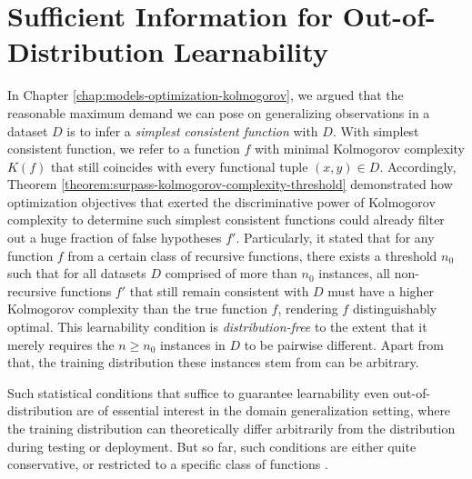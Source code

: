
\chapter{Sufficient Information for Out-of-Distribution Learnability}
\label{chap:sufficient-information-learnability}
In Chapter \ref{chap:models-optimization-kolmogorov}, we argued that the reasonable maximum demand we can pose on generalizing observations in a dataset $D$ is to infer a \textit{simplest consistent function} with $D$.
With simplest consistent function, we refer to a function $f$ with minimal Kolmogorov complexity $K(f)$ that still coincides with every functional tuple $(x,y)\in D$. 
Accordingly, Theorem \ref{theorem:surpass-kolmogorov-complexity-threshold} demonstrated how optimization objectives that exerted the discriminative power of Kolmogorov complexity to determine such simplest consistent functions could already filter out a huge fraction of false hypotheses $f'$.
Particularly, it stated that for any function $f$ from a certain class of recursive functions, there exists a threshold $n_0$ such that for all datasets $D$ comprised of more than $n_0$ instances, all non-recursive functions $f'$ that still remain consistent with $D$ must have a higher Kolmogorov complexity than the true function $f$, rendering $f$ distinguishably optimal.
This learnability condition is \textit{distribution-free} to the extent that it merely requires the $n\geq n_0$ instances in $D$ to be pairwise different. 
Apart from that, the training distribution these instances stem from can be arbitrary.

Such statistical conditions that suffice to guarantee learnability even out-of-distribution are of essential interest in the domain generalization setting, where the training distribution can theoretically differ arbitrarily from the distribution during testing or deployment.
But so far, such conditions are either quite conservative, or restricted to a specific class of functions \cite{arjovsky2019invariant,ahuja2021invariance}.

